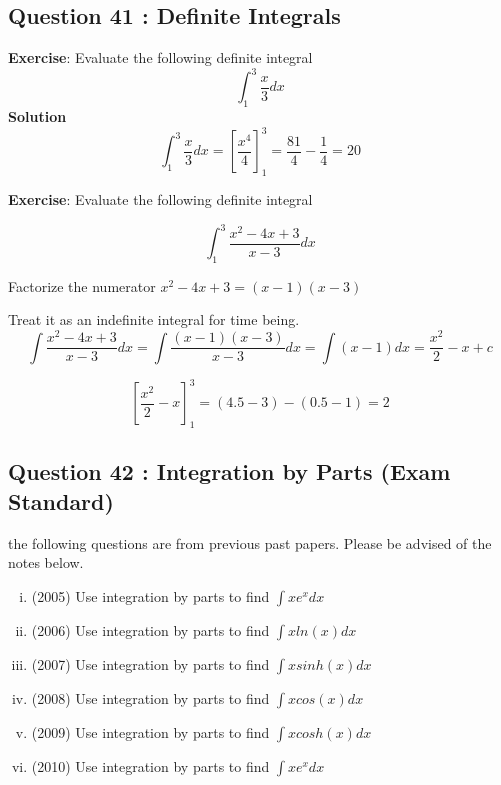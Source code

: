\documentclass[]{article}
\begin{document}
\subsection*{Question 41 : Definite Integrals}
\begin{framed}
	{\large
		\noindent \textbf{Exercise}: Evaluate the following definite integral
		\[ \int^{3}_{1} \frac{x}{3}  dx \]
		\textbf{Solution}
		\[ \int^{3}_{1} \frac{x}{3}  dx  = \left[\frac{x^4}{4}\right]^{3}_{1}= \frac{81}{4} - \frac{1}{4} = 20\]
	}
\end{framed}
\newpage
\begin{framed}
	{\large
		\noindent \textbf{Exercise}: Evaluate the following definite integral
		
		\[ \int^3_1 \frac{x^2 - 4x + 3}{x-3}  dx \] 
		
		\noindent	Factorize the numerator $x^2 - 4x + 3 = (x-1)(x-3)$
		
		
		Treat it as an indefinite integral for time being.			
		\[ \int \frac{x^2 - 4x + 3}{x-3}  dx = \int \frac{(x-1)(x-3)}{x-3}  dx  = \int (x-1) dx = \frac{x^2}{2} -x +c\] 
		
		\[ \left[ \frac{x^2}{2} -x\right]^{3}_{1} = (4.5-3)-(0.5-1) = 2\]
	}
\end{framed}


\subsection*{Question 42 : Integration by Parts (Exam Standard)}	
the following questions are from previous past papers. Please be advised of the notes below.
\begin{enumerate}[(i)]
	\item (2005) Use integration by parts to find $\displaystyle{\int xe^xdx}$ 
	
	\item (2006) Use integration by parts to find $\displaystyle{\int x ln(x) dx}$ 
	
	\item (2007) Use integration by parts to find $\displaystyle{\int x sinh(x) dx}$ 
	
	\item (2008) Use integration by parts to find $\displaystyle{\int x cos(x) dx}$ 
	
	\item (2009) Use integration by parts to find $\displaystyle{\int x cosh(x) dx}$ 
	
	\item (2010) Use integration by parts to find $\displaystyle{\int xe^xdx}$ 
\end{enumerate}
\end{document}

